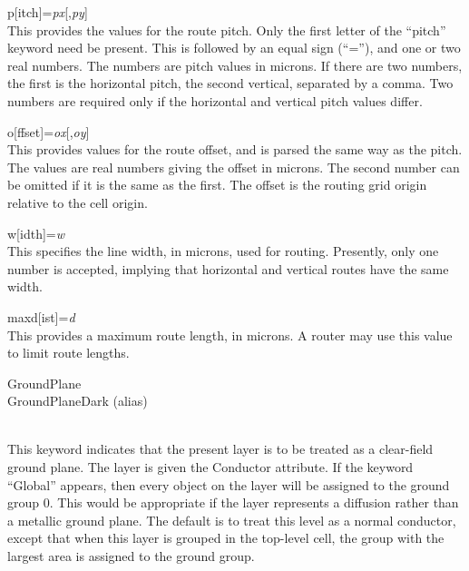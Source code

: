 \begin{description}
\begin{description}
\item{\vt p}[{\vt itch}]{\vt =}{\it px\/}[{\vt ,}{\it py\/}]\\
This provides the values for the route pitch.  Only the first letter
of the ``{\vt pitch}'' keyword need be present.  This is followed by
an equal sign (``{\vt =}''), and one or two real numbers.  The numbers
are pitch values in microns.  If there are two numbers, the first is
the horizontal pitch, the second vertical, separated by a comma.  Two
numbers are required only if the horizontal and vertical pitch values
differ.

\item{\vt o}[{\vt ffset}]{\vt =}{\it ox\/}[{\vt ,}{\it oy\/}]\\
This provides values for the route offset, and is parsed the same way
as the pitch.  The values are real numbers giving the offset in
microns.  The second number can be omitted if it is the same as the
first.  The offset is the routing grid origin relative to the cell
origin.

\item{\vt w}[{\vt idth}]{\vt =}{\it w}\\
This specifies the line width, in microns, used for routing. 
Presently, only one number is accepted, implying that horizontal and
vertical routes have the same width.

\item{\vt maxd}[{\vt ist}]{\vt =}{\it d}\\
This provides a maximum route length, in microns.  A router may use
this value to limit route lengths.
\end{description}

\item\parbox[b]{4in}{\rr
{\et GroundPlane}\\
{\et GroundPlaneDark} (alias)\\
}\\
This keyword indicates that the present layer is to be treated as a
clear-field ground plane.  The layer is given the {\et Conductor}
attribute.  If the keyword ``{\vt Global}'' appears, then every object
on the layer will be assigned to the ground group 0.  This would be
appropriate if the layer represents a diffusion rather than a metallic
ground plane.  The default is to treat this level as a normal
conductor, except that when this layer is grouped in the top-level
cell, the group with the largest area is assigned to the ground group.


\end{description}
